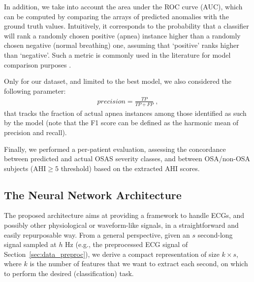 \documentclass[5p,twocolumn,lefttitle]{elsarticle}
\begin{document}
In addition, we take into account the area under the ROC curve (AUC), which can be computed by comparing  the arrays of predicted anomalies with the ground truth values. Intuitively, it corresponds to the probability that a classifier will rank a randomly chosen positive (apnea) instance higher than a randomly chosen negative (normal breathing) one, assuming that \lq positive\rq{} ranks higher than \lq negative\rq . Such a metric is commonly used in the literature for model comparison purposes \cite{fawcett2006introduction}.


Only for our dataset, and limited to the best model, we also considered the following parameter:
\begin{align}
    precision = \frac{TP}{TP + FP} \; ,
\end{align}
that tracks the fraction of actual apnea instances among those identified as such by the model (note that the F1 score can be defined as the harmonic mean of precision and recall). 

Finally, we performed a per-patient evaluation, assessing the concordance between predicted and actual OSAS severity classes, and between OSA/non-OSA subjects ($\text{AHI} \geq 5$ threshold) based on the extracted AHI scores.




\subsection{The Neural Network Architecture}


The proposed architecture aims at providing a framework to handle ECGs, and possibly other physiological or waveform-like signals, in a straightforward and easily repurposable way. From a general perspective,
given an $s$ second-long signal sampled at $h$ Hz (e.g., the preprocessed ECG signal of Section~\ref{sec:data_preproc}), we derive a compact representation of size $k \times s$, where $k$ is the number of features that we want to extract each second, on which to perform the desired (classification) task. 
\end{document}
